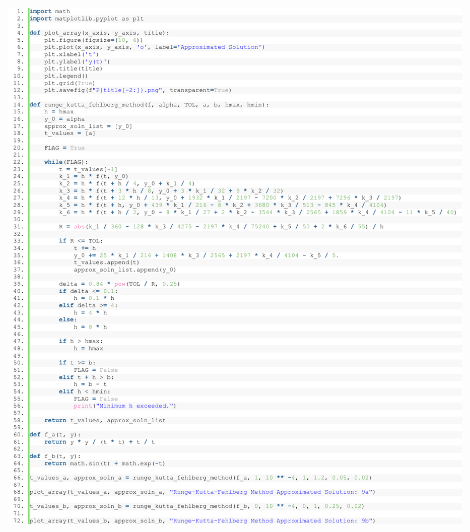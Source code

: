 \documentclass[11pt]{article}
\theoremstyle{break}
\numberwithin{equation}{theorem}
\begin{document}
\begin{center}
    \includegraphics[width=0.9\textwidth]{P9.png}
\end{center}
\end{document}
